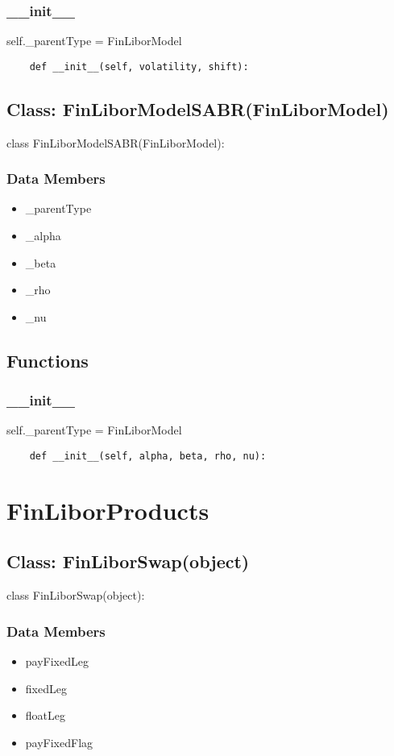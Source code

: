\documentclass[twoside,11pt]{book}
\begin{document}
\subsubsection*{{\bf \_\_init\_\_}}
self.\_parentType = FinLiborModel 

\begin{lstlisting}
    def __init__(self, volatility, shift):
\end{lstlisting}

\subsection*{Class: FinLiborModelSABR(FinLiborModel)}
class FinLiborModelSABR(FinLiborModel): 

\subsubsection*{Data Members}
\begin{itemize}
\item{\_parentType}
\item{\_alpha}
\item{\_beta}
\item{\_rho}
\item{\_nu}
\end{itemize}

\subsection*{Functions}

\subsubsection*{{\bf \_\_init\_\_}}
self.\_parentType = FinLiborModel 

\begin{lstlisting}
    def __init__(self, alpha, beta, rho, nu):
\end{lstlisting}

\newpage
\section{FinLiborProducts}

\subsection*{Class: FinLiborSwap(object)}
class FinLiborSwap(object): 

\subsubsection*{Data Members}
\begin{itemize}
\item{payFixedLeg}
\item{fixedLeg}
\item{floatLeg}
\item{payFixedFlag}
\end{itemize}
\end{document}

